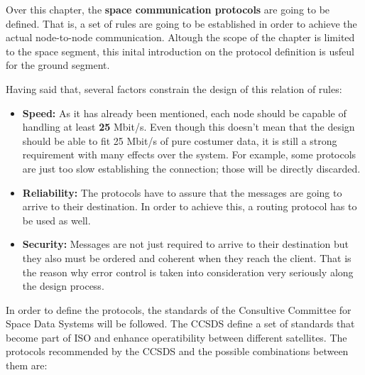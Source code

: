 Over this chapter, the \textbf{space communication protocols} are going to be defined. That is, a set of rules are going to be established in order to achieve the actual node-to-node communication. Altough the scope of the chapter is limited to the space segment, this inital introduction on the protocol definition is usfeul for the ground segment.

Having said that, several factors constrain the design of this relation of rules:

\begin{itemize}
\renewcommand{\labelitemi}{\scriptsize$\blacksquare$} 
\item \textbf{Speed:} As it has already been mentioned, each node should be capable of handling at least \textbf{25} Mbit/s. Even though this doesn't mean that the design should be able to fit 25 Mbit/s of pure costumer data, it is still a strong requirement with many effects over the system. For example, some protocols are just too slow establishing the connection; those will be directly discarded.

\item \textbf{Reliability:} The protocols have to assure that the messages are going to arrive to their destination. In order to achieve this, a routing protocol has to be used as well.

\item \textbf{Security:} Messages are not just required to arrive to their destination but they also must be ordered and coherent when they reach the client. That is the reason why error control is taken into consideration very seriously along the design process.
\end{itemize}
In order to define the protocols, the standards of the Consultive Committee for Space Data Systems will be followed. The CCSDS define a set of standards that become part of ISO and enhance operatibility between different satellites. The protocols recommended by the CCSDS and the possible combinations between them are:
